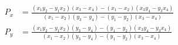 \begin{align} P_x&= \frac{(x_1 y_2-y_1 x_2)(x_3-x_4)-(x_1-x_2)(x_3 y_4-y_3 x_4)}{(x_1-x_2) (y_3-y_4) - (y_1-y_2) (x_3-x_4)} \\[4px] P_y&= \frac{(x_1 y_2-y_1 x_2)(y_3-y_4)-(y_1-y_2)(x_3 y_4-y_3 x_4)}{(x_1-x_2) (y_3-y_4) - (y_1-y_2) (x_3-x_4)} \end{align}
